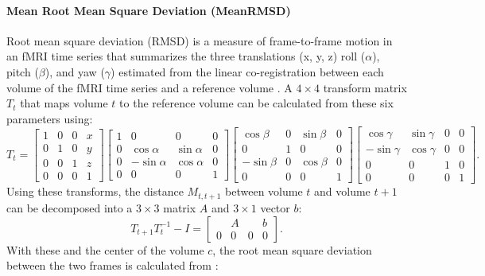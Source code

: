 \paragraph{Mean Root Mean Square Deviation (MeanRMSD)}
\label{sec:16}
Root mean square deviation (RMSD) is a measure of frame-to-frame motion in an fMRI time series that summarizes the three translations (x, y, z) roll ($\alpha$), pitch ($\beta$), and yaw ($\gamma$) estimated from the linear co-registration between each volume of the fMRI time series and a reference volume \citep{Jenkinson99FD}. A $4\times4$ transform matrix $T_t$ that maps volume $t$ to the reference volume can be calculated from these six parameters using:
\begin{equation}
    T_t = \begin{bmatrix}
          1 & 0 & 0 & x\\[-3mm]
          0 & 1 & 0 & y\\[-3mm]
          0 & 0 & 1 & z\\[-3mm]
          0 & 0 & 0 & 1
     \end{bmatrix}
     \begin{bmatrix}
          1 & 0 & 0 & 0\\[-3mm]
          0 & \cos\alpha & \sin\alpha & 0\\[-3mm]
          0 & -\sin\alpha & \cos\alpha & 0\\[-3mm]
          0 & 0 & 0 & 1
     \end{bmatrix}
     \begin{bmatrix}
          \cos\beta & 0 & \sin\beta & 0\\[-3mm]
          0 & 1 & 0 & 0 \\[-3mm]
          -\sin\beta & 0 & \cos\beta & 0\\[-3mm]
          0 & 0  & 0 & 1
     \end{bmatrix}
     \begin{bmatrix}
          \cos\gamma & \sin\gamma & 0 & 0\\[-3mm]
          -\sin\gamma & \cos\gamma & 0 & 0\\[-3mm]
          0 & 0 & 1 & 0\\[-3mm]
          0 & 0 & 0 & 1
     \end{bmatrix}.
\end{equation} Using these transforms, the distance $M_{t,t+1}$ between volume $t$ and volume $t+1$ can be decomposed into a $3\times3$ matrix $A$ and $3\times1$ vector $b$:
\begin{equation}
        T_{t+1}T_{t}^{-1}-I = \begin{bmatrix}
           & A & & b \\[-3mm]
          0 & 0 & 0 & 0
     \end{bmatrix}.
\end{equation} With these and the center of the volume  $c$, the root mean square deviation between the two frames is calculated from \citep[using the notation in][]{Yan2013}:

